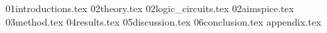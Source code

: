 \documentclass{article}
\begin{document}
\maketitle
\pagebreak
\tableofcontents

\pagebreak
{01introductions.tex}
\pagebreak
{02theory.tex}
\pagebreak
{02logic_circuits.tex}
\pagebreak
{02aimspice.tex}
\pagebreak
{03method.tex}
\pagebreak
{04results.tex}
\pagebreak
{05discussion.tex}
\pagebreak
{06conclusion.tex}
\pagebreak
{appendix.tex}
\printbibliography
\end{document}
